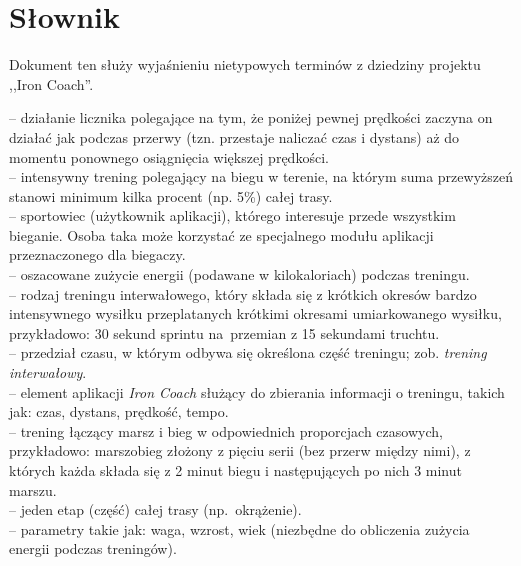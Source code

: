 \section{Słownik}
\noindent Dokument ten służy wyjaśnieniu nietypowych terminów z dziedziny projektu ,,Iron Coach''.
\begin{multicols}{2}
\begin{description}
	-- działanie licznika polegające na tym, że poniżej pewnej prędkości zaczyna on działać jak podczas przerwy (tzn. przestaje naliczać czas i dystans) aż do momentu ponownego osiągnięcia większej prędkości.\\
	-- intensywny trening polegający na biegu w terenie, na którym suma przewyższeń stanowi minimum kilka procent (np. 5\%) całej trasy.\\
	-- sportowiec (użytkownik aplikacji), którego interesuje przede wszystkim bieganie. Osoba taka może korzystać ze specjalnego modułu aplikacji przeznaczonego dla biegaczy. \\
	-- oszacowane zużycie energii (podawane w kilokaloriach) podczas treningu.\\
	-- rodzaj treningu interwałowego, który składa się z krótkich okresów bardzo intensywnego wysiłku przeplatanych krótkimi okresami umiarkowanego wysiłku, przykładowo: 30 sekund sprintu na~przemian z 15 sekundami truchtu.\\
	-- przedział czasu, w którym odbywa się określona część treningu; zob. \textit{trening interwałowy}.\\
	-- element aplikacji \textit{Iron Coach} służący do zbierania informacji o treningu, takich jak: czas, dystans, prędkość, tempo.\\
	-- trening łączący marsz i bieg w odpowiednich proporcjach czasowych, przykładowo: marszobieg złożony z pięciu serii (bez przerw między nimi), z których każda składa się z 2 minut biegu i następujących po nich 3 minut marszu.\\
	-- jeden etap (część) całej trasy \mbox{(np. okrążenie).}\\
	-- parametry takie jak: waga, wzrost, wiek (niezbędne do obliczenia zużycia energii podczas treningów).\\

\end{description}
\end{multicols}
